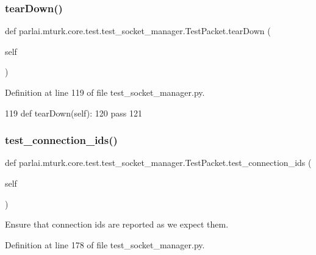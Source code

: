 \subsubsection{\texorpdfstring{tear\+Down()}{tearDown()}}
{\footnotesize\ttfamily def parlai.\+mturk.\+core.\+test.\+test\+\_\+socket\+\_\+manager.\+Test\+Packet.\+tear\+Down (\begin{DoxyParamCaption}\item[{}]{self }\end{DoxyParamCaption})}



Definition at line 119 of file test\+\_\+socket\+\_\+manager.\+py.


\begin{DoxyCode}
119     \textcolor{keyword}{def }tearDown(self):
120         \textcolor{keywordflow}{pass}
121 
\end{DoxyCode}
\mbox{\label{classparlai_1_1mturk_1_1core_1_1test_1_1test__socket__manager_1_1TestPacket_ad997a424a8ee3975bcc2cee55872777f}} 
\subsubsection{\texorpdfstring{test\+\_\+connection\+\_\+ids()}{test\_connection\_ids()}}
{\footnotesize\ttfamily def parlai.\+mturk.\+core.\+test.\+test\+\_\+socket\+\_\+manager.\+Test\+Packet.\+test\+\_\+connection\+\_\+ids (\begin{DoxyParamCaption}\item[{}]{self }\end{DoxyParamCaption})}

\begin{DoxyVerb}Ensure that connection ids are reported as we expect them.
\end{DoxyVerb}
 

Definition at line 178 of file test\+\_\+socket\+\_\+manager.\+py.


